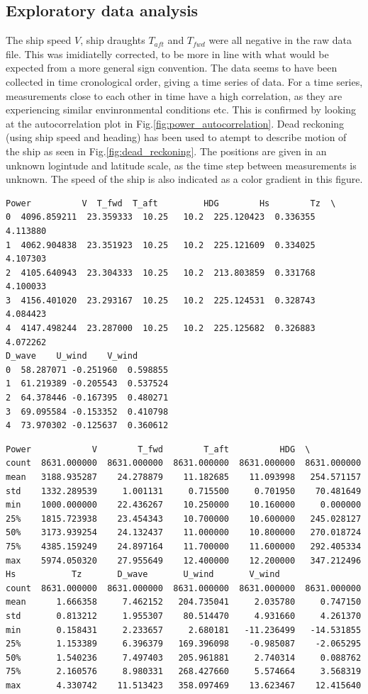 \subsection*{Exploratory data analysis}\label{exploratory-data-analysis}
The ship speed $V$, ship draughts $T_{aft}$ and $T_{fwd}$ were all
negative in the raw data file. This was imidiatelly corrected, to be
more in line with what would be expected from a more general sign
convention. The data seems to have been collected in time cronological
order, giving a time series of data. For a time series, measurements
close to each other in time have a high correlation, as they are
experiencing similar envinronmental conditions etc. This is confirmed by
looking at the autocorrelation plot in
Fig.\ref{fig:power_autocorrelation}. Dead reckoning (using ship
speed and heading) has been used to atempt to describe motion of the
ship as seen in Fig.\ref{fig:dead_reckoning}. The positions are
given in an unknown logintude and latitude scale, as the time step
between measurements is unknown. The speed of the ship is also indicated
as a color gradient in this figure.
\begin{verbatim}
Power          V  T_fwd  T_aft         HDG        Hs        Tz  \
0  4096.859211  23.359333  10.25   10.2  225.120423  0.336355  4.113880
1  4062.904838  23.351923  10.25   10.2  225.121609  0.334025  4.107303
2  4105.640943  23.304333  10.25   10.2  213.803859  0.331768  4.100033
3  4156.401020  23.293167  10.25   10.2  225.124531  0.328743  4.084423
4  4147.498244  23.287000  10.25   10.2  225.125682  0.326883  4.072262
D_wave    U_wind    V_wind
0  58.287071 -0.251960  0.598855
1  61.219389 -0.205543  0.537524
2  64.378446 -0.167395  0.480271
3  69.095584 -0.153352  0.410798
4  73.970302 -0.125637  0.360612
\end{verbatim}
\begin{verbatim}
Power            V        T_fwd        T_aft          HDG  \
count  8631.000000  8631.000000  8631.000000  8631.000000  8631.000000
mean   3188.935287    24.278879    11.182685    11.093998   254.571157
std    1332.289539     1.001131     0.715500     0.701950    70.481649
min    1000.000000    22.436267    10.250000    10.160000     0.000000
25%    1815.723938    23.454343    10.700000    10.600000   245.028127
50%    3173.939254    24.132437    11.000000    10.800000   270.018724
75%    4385.159249    24.897164    11.700000    11.600000   292.405334
max    5974.050320    27.955649    12.400000    12.200000   347.212496
Hs           Tz       D_wave       U_wind       V_wind
count  8631.000000  8631.000000  8631.000000  8631.000000  8631.000000
mean      1.666358     7.462152   204.735041     2.035780     0.747150
std       0.813212     1.955307    80.514470     4.931660     4.261370
min       0.158431     2.233657     2.680181   -11.236499   -14.531855
25%       1.153389     6.396379   169.396098    -0.985087    -2.065295
50%       1.540236     7.497403   205.961881     2.740314     0.088762
75%       2.160576     8.980331   268.427660     5.574664     3.568319
max       4.330742    11.513423   358.097469    13.623467    12.415640
\end{verbatim}
